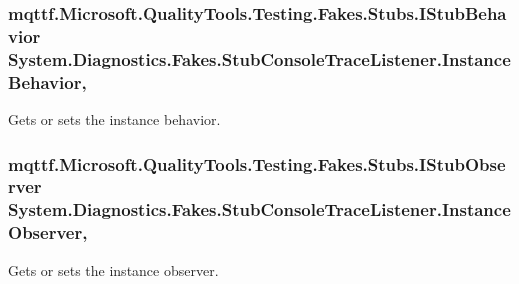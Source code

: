 \hypertarget{class_system_1_1_diagnostics_1_1_fakes_1_1_stub_console_trace_listener_a5286426476927284a7dac93d96610636}{
\subsubsection[{Instance\-Behavior}]{\setlength{\rightskip}{0pt plus 5cm}mqttf.\-Microsoft.\-Quality\-Tools.\-Testing.\-Fakes.\-Stubs.\-I\-Stub\-Behavior System.\-Diagnostics.\-Fakes.\-Stub\-Console\-Trace\-Listener.\-Instance\-Behavior\hspace{0.3cm}{\ttfamily [get]}, {\ttfamily [set]}}}\label{class_system_1_1_diagnostics_1_1_fakes_1_1_stub_console_trace_listener_a5286426476927284a7dac93d96610636}


Gets or sets the instance behavior.

\hypertarget{class_system_1_1_diagnostics_1_1_fakes_1_1_stub_console_trace_listener_aaf6c3abd6d9c745e24ec6c3cac12f966}{
\subsubsection[{Instance\-Observer}]{\setlength{\rightskip}{0pt plus 5cm}mqttf.\-Microsoft.\-Quality\-Tools.\-Testing.\-Fakes.\-Stubs.\-I\-Stub\-Observer System.\-Diagnostics.\-Fakes.\-Stub\-Console\-Trace\-Listener.\-Instance\-Observer\hspace{0.3cm}{\ttfamily [get]}, {\ttfamily [set]}}}\label{class_system_1_1_diagnostics_1_1_fakes_1_1_stub_console_trace_listener_aaf6c3abd6d9c745e24ec6c3cac12f966}


Gets or sets the instance observer.

